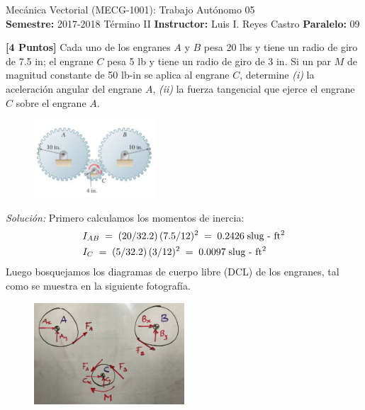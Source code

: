 \documentclass[ a4paper, twoside, 11pt]{article}
\newcommand{\numero}{05}
\begin{document}
\allowdisplaybreaks

\begin{center}
\Large Mec\'anica Vectorial (MECG-1001): Trabajo Aut\'onomo \numero \\[2ex]
\small \textbf{Semestre:} 2017-2018 T\'ermino II \qquad
\textbf{Instructor:} Luis I. Reyes Castro \qquad
\textbf{Paralelo:} 09
\end{center}
\fullskip

\newcommand{\uvec}[1]{\vec{\hat{#1}}}
\newcommand{\cross}{\,\vec{\times}\,}

\begin{problem}
\textbf{[4 Puntos]} Cada uno de los engranes $A$ y $B$ pesa 20 lbs y tiene un radio de giro de 7.5 in; el engrane $C$ pesa 5 lb y tiene un radio de giro de 3 in. Si un par $M$ de magnitud constante de 50 lb-in se aplica al engrane $C$, determine \textit{(i)} la aceleraci\'on angular del engrane $A$, \linebreak \textit{(ii)} la fuerza tangencial que ejerce el engrane $C$ sobre el engrane $A$.

\begin{figure}[htb]
\centering
\includegraphics[width=0.4\textwidth]{problema-1.jpg}
\end{figure}

\emph{Soluci\'on:} Primero calculamos los momentos de inercia: 
\begin{align*}
& I_{AB} \; = \; (20/32.2) \, (7.5/12)^2 \; = \;
0.2426 \; \text{slug - ft\ensuremath{^{\text{2}}}} \\
& I_{C} \; = \; (5/32.2) \, (3/12)^2 \; = \;
0.0097 \; \text{slug - ft\ensuremath{^{\text{2}}}}
\end{align*}
Luego bosquejamos los diagramas de cuerpo libre (DCL) de los engranes, tal como se muestra en la siguiente fotograf\'ia. 
\begin{figure}[htb]
\centering
\includegraphics[width=0.5\textwidth]{problema-1_DCL.jpg}
\end{figure}


\end{problem}
\end{document}
